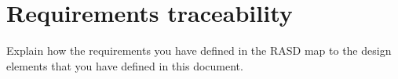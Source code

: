 \section{Requirements traceability}
Explain how the requirements you have defined in the RASD map to the design elements that you have defined in this document.